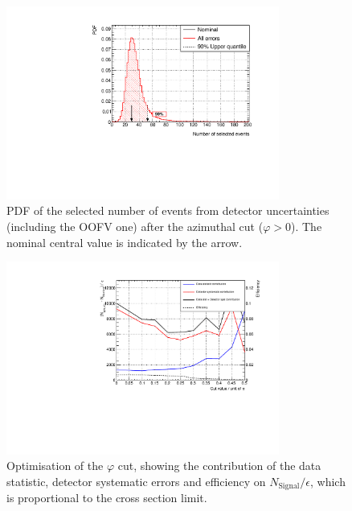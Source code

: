 \begin{figure}[ht]
  \begin{adjustbox}{center}
    \includegraphics[width=0.8\textwidth]{T2K-TN-254/images/systematics/QuantilePhiBTZ.pdf} 
  \end{adjustbox}
  \caption[PDF of the selected number of events from the detector
  uncertainties after the azimuthal cut ($\varphi > 0$)]{\Gls{PDF} of
    the selected number of events from detector uncertainties
    (including the \Gls{OOFV} one) after the azimuthal cut
    ($\varphi > 0$). The nominal central value is indicated by the
    arrow.}
  \label{fig:detectorphi}
\end{figure}

\begin{figure}[ht]
  \begin{adjustbox}{center}
    \includegraphics[width=0.8\textwidth]{T2K-TN-254/images/systematics/Optimisation.pdf} 
  \end{adjustbox}
  \caption[Optimisation of the $\varphi$ cut]{Optimisation of the
    $\varphi$ cut, showing the contribution of the data statistic,
    detector systematic errors and efficiency on
    $N_\text{Signal}/\epsilon$, which is proportional to the cross
    section limit.}
  \label{fig:optimisationphi}
\end{figure}

